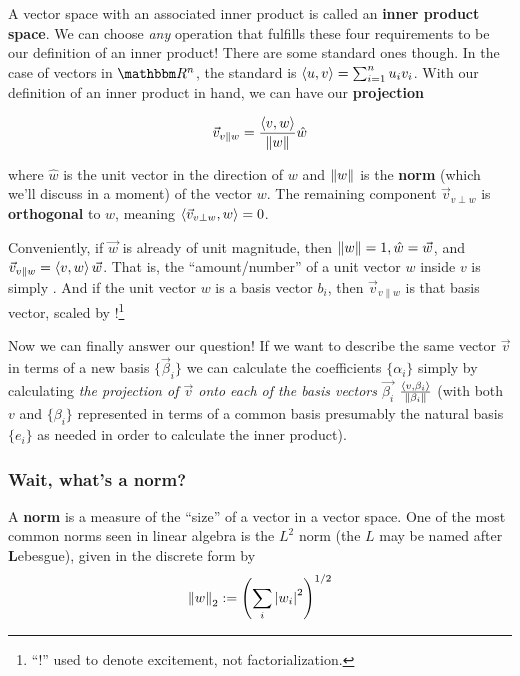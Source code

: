 \documentclass[../main/main.tex]{subfiles}
\begin{document}
A vector space with an associated inner product is called an \textbf{inner product space}.
We can choose \emph{any} operation that fulfills these four requirements to be our
definition of an inner product! There are some standard ones though.
In the case of vectors in \(\domain{R^n}\), the standard is
\(\left<u,v\right> = \sum_{i=1}^{n}u_i v_i \).
With our definition of an inner product in hand, we can have our \textbf{projection}

\begin{equation}
\vec{v}_{v\parallel w} = \frac{\left<v,w\right>}{\norm{w}} \hat{w}
\end{equation}\label{equation:projection}

where \(\hat{w}\) is the unit vector in the direction of \(w\) and \(\norm{w}\)
is the
\textbf{norm} (which we'll discuss in a moment)
of the vector \(w\).
The remaining component \(\vec{v}_{v\perp w}\) is \textbf{orthogonal} to \(w\),
meaning \(\left<\vec{v}_{v\perp w},w\right> = 0\).
\par 

Conveniently, if \(\vec{w}\) is already of unit magnitude, 
then \(\norm{w} = 1, \hat{w} = \vec{w}\), and
\(\vec{v}_{v\parallel w} = \left<v,w\right>\vec{w}\).
That is, the ``amount/number'' of a 
unit vector \(w\) inside \(v\) is simply .
And if the unit vector \(w\) is a basis vector \(b_i\), then 
\(\vec{v}_{v\parallel w}\) is 
that basis vector, scaled by !\footnote{
  ``!'' used to denote excitement, not factorialization.
}
\par

Now we can finally answer our question! 
If we want to describe the same vector \(\vec{v}\)
in terms of a new basis \(\{\vec{\beta}_i\}\) 
we can calculate the coefficients \(\{\alpha_i\}\)
simply by calculating \emph{the projection of \(\vec{v}\)
onto each of the basis vectors \(\vec{\beta_i}\)}
\(\frac{\left<v,\beta_i\right>}{\norm{\beta_i}}\)
(with both \(v\) and \(\{\beta_i\}\) represented
in terms of a common basis
\textemdash{} presumably the natural basis \(\{e_i\}\) \textemdash{}
as needed in order to calculate the inner product).

\subsubsection*{Wait, what's a norm?}

A \textbf{norm} is a measure of the ``size''
of a vector in a vector space.
One of the most common norms seen
in linear algebra is
the \(L^2\) norm 
(the \(L\) may be named after \textbf{L}ebesgue), 
given in the discrete form by
\[\norm{w}_2 := \left(\sum_{i} \abs{w_i}^2\right)^{1/2}\]
\end{document}
